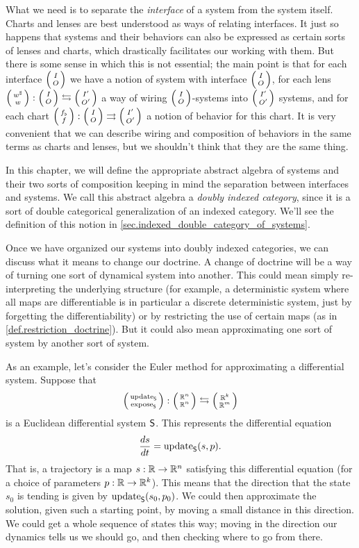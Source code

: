 \documentclass[DynamicalBook]{subfiles}
\begin{document}
What we need is to separate the \emph{interface} of a system from the system
itself. Charts and lenses are best understood as ways of relating interfaces. It just
so happens that systems and their behaviors can also be expressed as certain
sorts of lenses and charts, which drastically facilitates our working with them.
But there is some sense in which this is not essential; the main point is that
for each interface $\lens{I}{O}$ we have a notion of system with interface
$\lens{I}{O}$, for each lens $\lens{w^{\sharp}}{w} : \lens{I}{O} \fromto
\lens{I'}{O'}$ a way of wiring $\lens{I}{O}$-systems into $\lens{I'}{O'}$
systems, and for each chart $\lens{f_{\flat}}{f} : \lens{I}{O} \tto
\lens{I'}{O'}$ a notion of behavior for this chart. It is very convenient that
we can describe wiring and composition of behaviors in the same terms as charts
and lenses, but we shouldn't think that they are the same thing.

In this chapter, we will define the appropriate abstract algebra of systems and
their two sorts of composition keeping in mind the separation between interfaces
and systems. We call this abstract algebra a \emph{doubly indexed category},
since it is a sort of double categorical generalization of an indexed category.
We'll see the definition of this notion in
\cref{sec.indexed_double_category_of_systems}.

Once we have organized our systems into doubly indexed categories, we can
discuss what it means to change our doctrine. A change of doctrine will be a way
of turning one sort of dynamical system into another. This could mean simply
re-interpreting the underlying structure (for example, a deterministic system
where all maps are differentiable is in particular a discrete deterministic
system, just by forgetting the differentiability) or by restricting the use of
certain maps (as in \cref{def.restriction_doctrine}). But it could also mean
approximating one sort of system by another sort of system.

As an example, let's consider the Euler method for approximating a differential
system. Suppose that
\[
\lens{\update{S}}{\expose{S}} : \lens{\rr^{n}}{\rr^n} \fromto \lens{\rr^k}{\rr^m}
\]
is a Euclidean differential system $\mathsf{S}$. This represents the differential equation
\[
\frac{ds}{dt} = \mathrm{update}_{\mathsf{S}}(s, p).
\]
That is, a trajectory is a map $s : \mathbb{R} \to \mathbb{R}^n$ satisfying this differential
equation (for a choice of parameters $p : \mathbb{R} \to \mathbb{R}^k$). This means that the
direction that the state $s_0$ is tending is given by $\mathrm{update}_{\mathsf{S}}(s_0, p_0)$. We
could then approximate the solution, given such a starting point, by moving a
small distance in this direction. We could get a whole sequence of states this
way; moving in the direction our dynamics tells us we should go, and then
checking where to go from there.
\end{document}
